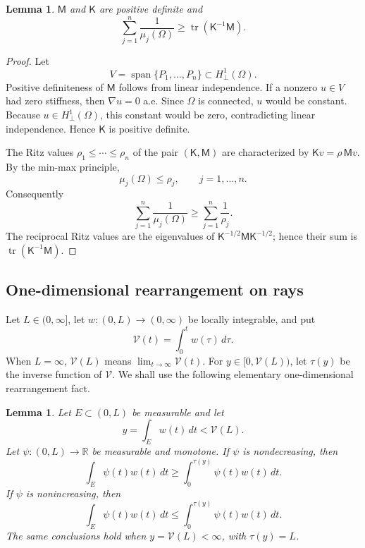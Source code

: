 \documentclass[10pt,a4paper]{amsart}
\newtheorem{lemma}[theorem]{Lemma}
\DeclareMathOperator{\tr}{tr}
\DeclareMathOperator{\spanop}{span}
\newcommand{\RR}{\mathbb R}
\newcommand{\mcM}{\mathsf M}
\newcommand{\mcK}{\mathsf K}
\begin{document}
\begin{lemma}\label{lem:trace-ritz}
$\mcM$ and $\mcK$ are positive definite and
\begin{equation}\label{eq:trace-ritz}
        \sum_{j=1}^n\frac1{\mu_j(\Omega)}
        \ge \tr(\mcK^{-1}\mcM).
\end{equation}
\end{lemma}

\begin{proof}
Let
$$
        V=\spanop\{P_1,\dots,P_n\}\subset H^1_{\perp}(\Omega).
$$
Positive definiteness of $\mcM$ follows from linear independence.  If a nonzero $u\in V$ had zero stiffness, then $\nabla u=0$ a.e.  Since $\Omega$ is connected, $u$ would be constant.  Because $u\in H^1_{\perp}(\Omega)$, this constant would be zero, contradicting linear independence.  Hence $\mcK$ is positive definite.

The Ritz values $\rho_1\le\cdots\le\rho_n$ of the pair $(\mcK,\mcM)$ are characterized by
$
        \mcK v=\rho\,\mcM v 
$.  By the min-max principle,
$$
        \mu_j(\Omega)\le \rho_j,
        \qquad j=1,\dots,n.
$$
Consequently
$$
        \sum_{j=1}^n\frac1{\mu_j(\Omega)}
        \ge \sum_{j=1}^n\frac1{\rho_j}.
$$
The reciprocal Ritz values are the eigenvalues of $\mcK^{-1/2}\mcM\mcK^{-1/2}$; hence their sum is $\tr(\mcK^{-1}\mcM)$.
\end{proof}

\subsection{One-dimensional rearrangement on rays}

Let $L\in(0,\infty]$, let $w:(0,L)\to(0,\infty)$ be locally integrable, and put
$$
        \mathcal V(t)=\int_0^t w(\tau)\,d\tau.
$$
When $L=\infty$, $\mathcal V(L)$ means $\lim_{t\to\infty}\mathcal V(t)$.  For $y\in[0,\mathcal V(L))$, let $\tau(y)$ be the inverse function of $\mathcal V$. We shall use the following elementary one-dimensional rearrangement fact.

\begin{lemma}\label{lem:ray-rearrangement}
Let $E\subset(0,L)$ be measurable and let
$$
        y=\int_Ew(t)\,dt<\mathcal V(L).
$$
Let $\psi:(0,L)\to\RR$ be measurable and monotone.    If $\psi$ is nondecreasing, then
$$
        \int_E\psi(t)w(t)\,dt
        \ge \int_0^{\tau(y)}\psi(t)w(t)\,dt.
$$
If $\psi$ is nonincreasing, then
$$
        \int_E\psi(t)w(t)\,dt
        \le \int_0^{\tau(y)}\psi(t)w(t)\,dt.
$$
The same conclusions hold when $y=\mathcal V(L)<\infty$, with $\tau(y)=L$.
\end{lemma}
\end{document}
